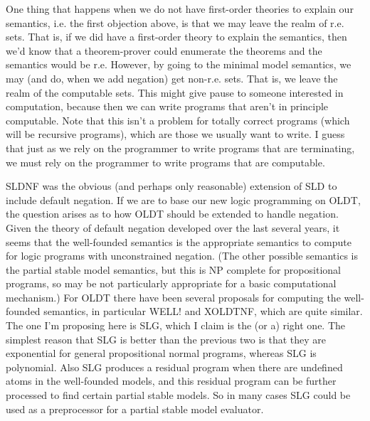One thing that happens when we do not have first-order theories to
explain our semantics, i.e. the first objection above, is that we may
leave the realm of r.e. sets.  That is, if we did have a first-order
theory to explain the semantics, then we'd know that a theorem-prover
could enumerate the theorems and the semantics would be r.e.  However,
by going to the minimal model semantics, we may (and do, when we add
negation) get non-r.e. sets.  That is, we leave the realm of the
computable sets.  This might give pause to someone interested in
computation, because then we can write programs that aren't in
principle computable.  Note that this isn't a problem for totally
correct programs (which will be recursive programs), which are those
we usually want to write.  I guess that just as we rely on the
programmer to write programs that are terminating, we must rely on the
programmer to write programs that are computable.

SLDNF was the obvious (and perhaps only reasonable) extension of SLD
to include default negation.  If we are to base our new logic
programming on OLDT, the question arises as to how OLDT should be
extended to handle negation.  Given the theory of default negation
developed over the last several years, it seems that the well-founded
semantics is the appropriate semantics to compute for logic programs
with unconstrained negation.  (The other possible semantics is the
partial stable model semantics, but this is NP complete for
propositional programs, so may be not particularly appropriate for a
basic computational mechanism.)  For OLDT there have been several
proposals for computing the well-founded semantics, in particular
WELL! and XOLDTNF, which are quite similar.  The one I'm proposing
here is SLG, which I claim is the (or a) right one.  The simplest
reason that SLG is better than the previous two is that they are
exponential for general propositional normal programs, whereas SLG is
polynomial.  Also SLG produces a residual program when there are
undefined atoms in the well-founded models, and this residual program
can be further processed to find certain partial stable models.  So in
many cases SLG could be used as a preprocessor for a partial stable
model evaluator.

